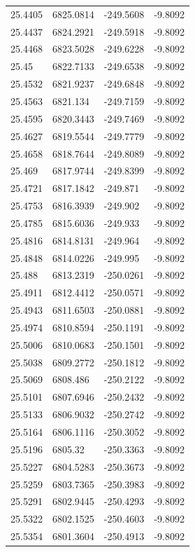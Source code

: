 \begin{table}[H]
\begin{tabular}{llll}
25.4405 & 6825.0814 & -249.5608 & -9.8092 \\
25.4437 & 6824.2921 & -249.5918 & -9.8092 \\
25.4468 & 6823.5028 & -249.6228 & -9.8092 \\
25.45 & 6822.7133 & -249.6538 & -9.8092 \\
25.4532 & 6821.9237 & -249.6848 & -9.8092 \\
25.4563 & 6821.134 & -249.7159 & -9.8092 \\
25.4595 & 6820.3443 & -249.7469 & -9.8092 \\
25.4627 & 6819.5544 & -249.7779 & -9.8092 \\
25.4658 & 6818.7644 & -249.8089 & -9.8092 \\
25.469 & 6817.9744 & -249.8399 & -9.8092 \\
25.4721 & 6817.1842 & -249.871 & -9.8092 \\
25.4753 & 6816.3939 & -249.902 & -9.8092 \\
25.4785 & 6815.6036 & -249.933 & -9.8092 \\
25.4816 & 6814.8131 & -249.964 & -9.8092 \\
25.4848 & 6814.0226 & -249.995 & -9.8092 \\
25.488 & 6813.2319 & -250.0261 & -9.8092 \\
25.4911 & 6812.4412 & -250.0571 & -9.8092 \\
25.4943 & 6811.6503 & -250.0881 & -9.8092 \\
25.4974 & 6810.8594 & -250.1191 & -9.8092 \\
25.5006 & 6810.0683 & -250.1501 & -9.8092 \\
25.5038 & 6809.2772 & -250.1812 & -9.8092 \\
25.5069 & 6808.486 & -250.2122 & -9.8092 \\
25.5101 & 6807.6946 & -250.2432 & -9.8092 \\
25.5133 & 6806.9032 & -250.2742 & -9.8092 \\
25.5164 & 6806.1116 & -250.3052 & -9.8092 \\
25.5196 & 6805.32 & -250.3363 & -9.8092 \\
25.5227 & 6804.5283 & -250.3673 & -9.8092 \\
25.5259 & 6803.7365 & -250.3983 & -9.8092 \\
25.5291 & 6802.9445 & -250.4293 & -9.8092 \\
25.5322 & 6802.1525 & -250.4603 & -9.8092 \\
25.5354 & 6801.3604 & -250.4913 & -9.8092 \\

\end{tabular}
\end{table}
